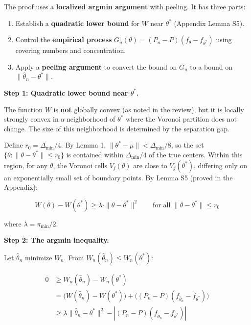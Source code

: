 \documentclass[
  12pt,
]{ctexart}
\providecommand{\tightlist}{%
  \setlength{\itemsep}{0pt}\setlength{\parskip}{0pt}}
\begin{document}
The proof uses a \textbf{localized argmin argument} with peeling. It has
three parts:

\begin{enumerate}
\def\labelenumi{\arabic{enumi}.}
\tightlist
\item
  Establish a \textbf{quadratic lower bound} for \(W\) near \(\theta^*\)
  (Appendix Lemma S5).
\item
  Control the \textbf{empirical process}
  \(G_n(\theta) = (P_n - P)(f_\theta - f_{\theta^*})\) using covering
  numbers and concentration.
\item
  Apply a \textbf{peeling argument} to convert the bound on \(G_n\) to a
  bound on \(\|\hat{\theta}_n - \theta^*\|\).
\end{enumerate}

\textbf{Step 1: Quadratic lower bound near \(\theta^*\).}

The function \(W\) is \textbf{not} globally convex (as noted in the
review), but it is locally strongly convex in a neighborhood of
\(\theta^*\) where the Voronoi partition does not change. The size of
this neighborhood is determined by the separation gap.

Define \(r_0 = \Delta_{\min}/4\). By Lemma 1,
\(\|\theta^* - \mu\| < \Delta_{\min}/8\), so the set
\(\{\theta : \|\theta - \theta^*\| \leq r_0\}\) is contained within
\(\Delta_{\min}/4\) of the true centers. Within this region, for any
\(\theta\), the Voronoi cells \(V_j(\theta)\) are close to
\(V_j(\theta^*)\), differing only on an exponentially small set of
boundary points. By Lemma S5 (proved in the Appendix):

\[W(\theta) - W(\theta^*) \geq \lambda \cdot \|\theta - \theta^*\|^2 \qquad \text{for all } \|\theta - \theta^*\| \leq r_0 \tag{2}\]

where \(\lambda = \pi_{\min} / 2\).

\textbf{Step 2: The argmin inequality.}

Let \(\hat{\theta}_n\) minimize \(W_n\). From
\(W_n(\hat{\theta}_n) \leq W_n(\theta^*)\):

\[\begin{aligned}
0 &\geq W_n(\hat{\theta}_n) - W_n(\theta^*) \\
&= \bigl(W(\hat{\theta}_n) - W(\theta^*)\bigr) + \bigl((P_n-P)(f_{\hat{\theta}_n} - f_{\theta^*})\bigr) \\
&\geq \lambda \|\hat{\theta}_n - \theta^*\|^2 - |(P_n-P)(f_{\hat{\theta}_n} - f_{\theta^*})|
\end{aligned}\]
\end{document}
